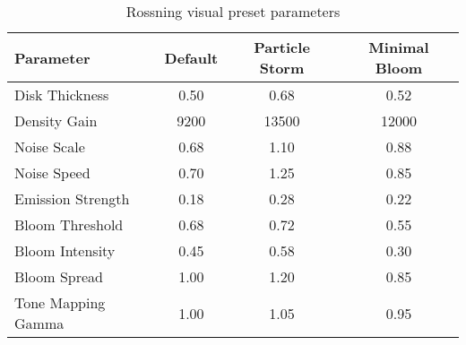 \documentclass[12pt,a4paper]{article}
\theoremstyle{definition}
\theoremstyle{remark}
\begin{document}
\begin{table}[H]
\centering
\caption{Rossning visual preset parameters}
\begin{tabular}{lccc}
\toprule
\textbf{Parameter} & \textbf{Default} & \textbf{Particle Storm} & \textbf{Minimal Bloom} \\
\midrule
Disk Thickness & 0.50 & 0.68 & 0.52 \\
Density Gain & 9200 & 13500 & 12000 \\
Noise Scale & 0.68 & 1.10 & 0.88 \\
Noise Speed & 0.70 & 1.25 & 0.85 \\
Emission Strength & 0.18 & 0.28 & 0.22 \\
Bloom Threshold & 0.68 & 0.72 & 0.55 \\
Bloom Intensity & 0.45 & 0.58 & 0.30 \\
Bloom Spread & 1.00 & 1.20 & 0.85 \\
Tone Mapping Gamma & 1.00 & 1.05 & 0.95 \\
\bottomrule
\end{tabular}
\label{tab:rossning_presets}
\end{table}
\end{document}
